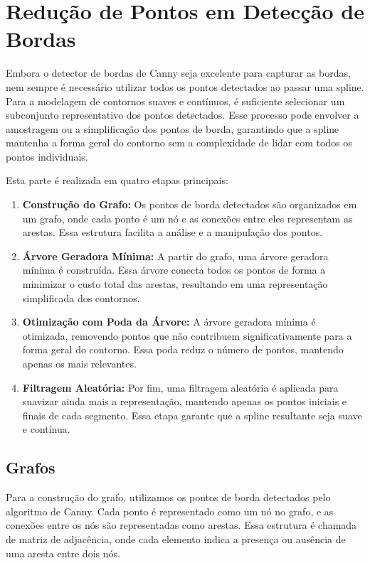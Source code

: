 \newpage

\section{Redução de Pontos em Detecção de Bordas}
\label{sec:reduzindo-pontos-deteccao-bordas}


Embora o detector de bordas de Canny seja excelente para capturar as bordas, nem sempre é necessário utilizar todos os pontos detectados ao passar uma spline. Para a modelagem de contornos suaves e contínuos, é suficiente selecionar um subconjunto representativo dos pontos detectados. Esse processo pode envolver a amostragem ou a simplificação dos pontos de borda, garantindo que a spline mantenha a forma geral do contorno sem a complexidade de lidar com todos os pontos individuais.

Esta parte é realizada em quatro etapas principais:
\begin{enumerate}
    \item \textbf{Construção do Grafo:} Os pontos de borda detectados são organizados em um grafo, onde cada ponto é um nó e as conexões entre eles representam as arestas. Essa estrutura facilita a análise e a manipulação dos pontos.
    \item \textbf{Árvore Geradora Mínima:} A partir do grafo, uma árvore geradora mínima é construída. Essa árvore conecta todos os pontos de forma a minimizar o custo total das arestas, resultando em uma representação simplificada dos contornos.
    \item \textbf{Otimização com Poda da Árvore:} A árvore geradora mínima é otimizada, removendo pontos que não contribuem significativamente para a forma geral do contorno. Essa poda reduz o número de pontos, mantendo apenas os mais relevantes.
    \item \textbf{Filtragem Aleatória:} Por fim, uma filtragem aleatória é aplicada para suavizar ainda mais a representação, mantendo apenas os pontos iniciais e finais de cada segmento. Essa etapa garante que a spline resultante seja suave e contínua.
\end{enumerate}

\subsection{Grafos}

Para a construção do grafo, utilizamos os pontos de borda detectados pelo algoritmo de Canny. Cada ponto é representado como um nó no grafo, e as conexões entre os nós são representadas como arestas. Essa estrutura é chamada de matriz de adjacência, onde cada elemento indica a presença ou ausência de uma aresta entre dois nós.

